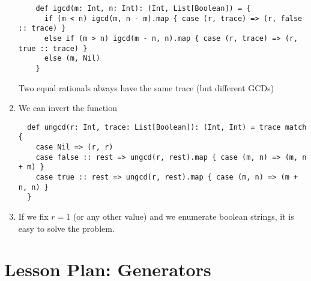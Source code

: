 \documentclass[9pt]{extbook}
\begin{document}
\begin{enumerate}
  \begin{lstlisting}
    def igcd(m: Int, n: Int): (Int, List[Boolean]) = {
      if (m < n) igcd(m, n - m).map { case (r, trace) => (r, false :: trace) }
      else if (m > n) igcd(m - n, n).map { case (r, trace) => (r, true :: trace) }
      else (m, Nil)
    }
  \end{lstlisting}

  Two equal rationals always have the same trace (but different GCDs)

\item We can invert the function

  \begin{lstlisting}
  def ungcd(r: Int, trace: List[Boolean]): (Int, Int) = trace match {
    case Nil => (r, r)
    case false :: rest => ungcd(r, rest).map { case (m, n) => (m, n + m) }
    case true :: rest => ungcd(r, rest).map { case (m, n) => (m + n, n) }
  }
  \end{lstlisting}

\item If we fix $r = 1$ (or any other value) and we enumerate boolean strings, it is easy to
  solve the problem.

\end{enumerate}


\chapter{Lesson Plan: Generators}
  
\end{document}
